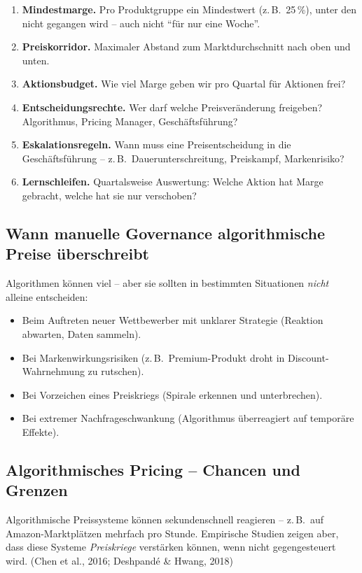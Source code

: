 \documentclass[11pt,a4paper,oneside]{article}
\newcommand{\fachbegriff}[1]{\textbf{#1}}
\newcommand{\quelle}[1]{{\footnotesize\color{lpGray}(#1)}}
\begin{document}
\begin{enumerate}
  \item \fachbegriff{Mindestmarge.} Pro Produktgruppe ein Mindestwert (z.\,B.\ 25\,\%), unter den nicht gegangen wird -- auch nicht ``für nur eine Woche''.
  \item \fachbegriff{Preiskorridor.} Maximaler Abstand zum Marktdurchschnitt nach oben und unten.
  \item \fachbegriff{Aktionsbudget.} Wie viel Marge geben wir pro Quartal für Aktionen frei?
  \item \fachbegriff{Entscheidungsrechte.} Wer darf welche Preisveränderung freigeben? Algorithmus, Pricing Manager, Geschäftsführung?
  \item \fachbegriff{Eskalationsregeln.} Wann muss eine Preisentscheidung in die Geschäftsführung -- z.\,B.\ Dauerunterschreitung, Preiskampf, Markenrisiko?
  \item \fachbegriff{Lernschleifen.} Quartalsweise Auswertung: Welche Aktion hat Marge gebracht, welche hat sie nur verschoben?
\end{enumerate}

\subsection{Wann manuelle Governance algorithmische Preise überschreibt}

Algorithmen können viel -- aber sie sollten in bestimmten Situationen \emph{nicht} alleine entscheiden:

\begin{itemize}
  \item Beim Auftreten neuer Wettbewerber mit unklarer Strategie (Reaktion abwarten, Daten sammeln).
  \item Bei Markenwirkungsrisiken (z.\,B.\ Premium-Produkt droht in Discount-Wahrnehmung zu rutschen).
  \item Bei Vorzeichen eines Preiskriegs (Spirale erkennen und unterbrechen).
  \item Bei extremer Nachfrageschwankung (Algorithmus überreagiert auf temporäre Effekte).
\end{itemize}

\subsection{Algorithmisches Pricing -- Chancen und Grenzen}

Algorithmische Preissysteme können sekundenschnell reagieren -- z.\,B.\ auf Amazon-Marktplätzen mehrfach pro Stunde. Empirische Studien zeigen aber, dass diese Systeme \emph{Preiskriege} verstärken können, wenn nicht gegengesteuert wird. \quelle{Chen et al., 2016; Deshpandé \& Hwang, 2018}
\end{document}

